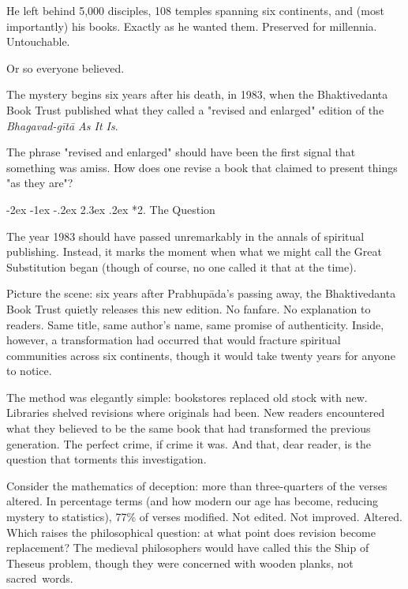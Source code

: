 \documentclass[12pt,twoside]{book}
\makeatletter
\renewcommand\section{\@startsection{section}{1}{\z@}%
{-3.5ex \@plus -1ex \@minus -.2ex}%
{2.3ex \@plus.2ex}%
{\normalfont\Large\bfseries}}
\let\oldsection\section
\renewcommand{\section}[1]{\needspace{4\baselineskip}\oldsection{#1}}
\def\cleardoublepage{\clearpage\if@twoside \ifodd\c@page\else\hbox{}\thispagestyle{empty}\newpage\if@twocolumn\hbox{}\newpage\fi\fi\fi}
\renewcommand\section{\@startsection{section}{1}{\z@}%
{-2ex \@plus -1ex \@minus -.2ex}%
{2.3ex \@plus.2ex}%
{\normalfont\Large\bfseries}}
\makeatother
\begin{document}
He left behind 5,000 disciples, 108 temples spanning six continents, and (most importantly) his books. Exactly as he wanted them. Preserved for millennia. Untouchable.

Or so everyone believed.

The mystery begins six years after his death, in 1983, when the Bhaktivedanta Book Trust published what they called a "revised and enlarged" edition of the \emph{Bhagavad-gītā As It Is}.

\clearpage

The phrase "revised and enlarged" should have been the first signal that something was amiss. How does one revise a book that claimed to present things "as they are"?

\cleardoublepage
\vspace*{0.20\textheight}
\section*{2. The Question}
\thispagestyle{chapterpage}

\normalfont\justifying
The year 1983 should have passed unremarkably in the annals of spiritual publishing. Instead, it marks the moment when what we might call the Great Substitution began (though of course, no one called it that at the time).

Picture the scene: six years after Prabhupāda's passing away, the Bhaktivedanta Book Trust quietly releases this new edition. No fanfare. No explanation to readers. Same title, same author's name, same promise of authenticity. Inside, however, a transformation had occurred that would fracture spiritual communities across six continents, though it would take twenty years for anyone to notice.

The method was elegantly simple: bookstores replaced old stock with new. Libraries shelved revisions where originals had been. New readers encountered what they believed to be the same book that had transformed the previous generation. The perfect crime, if crime it was. And that, dear reader, is the question that torments this investigation.

Consider the mathematics of deception: more than three-quarters of the verses altered. In percentage terms (and how modern our age has become, reducing mystery to statistics), 77\% of verses modified. Not edited. Not improved. Altered. Which raises the philosophical question: at what point does revision become replacement? The medieval philosophers would have called this the Ship of Theseus problem, though they were concerned with wooden planks, not sacred~words.
\end{document}
